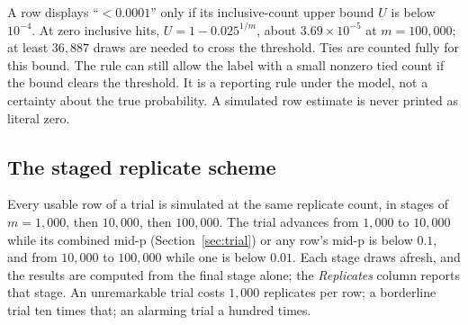 \documentclass[11pt,a4paper]{article}
\begin{document}
A row displays ``$<0.0001$'' only if its inclusive-count upper bound $U$ is below $10^{-4}$. At zero inclusive hits, $U=1-0.025^{1/m}$, about $3.69\times10^{-5}$ at $m=100{,}000$; at least $36{,}887$ draws are needed to cross the threshold. Ties are counted fully for this bound. The rule can still allow the label with a small nonzero tied count if the bound clears the threshold. It is a reporting rule under the model, not a certainty about the true probability. A simulated row estimate is never printed as literal zero.

\subsection{The staged replicate scheme}
\label{sec:staging}

Every usable row of a trial is simulated at the same replicate count, in stages of $m = 1{,}000$, then $10{,}000$, then $100{,}000$. The trial advances from $1{,}000$ to $10{,}000$ while its combined mid-p (Section~\ref{sec:trial}) or any row's mid-p is below $0.1$, and from $10{,}000$ to $100{,}000$ while one is below $0.01$. Each stage draws afresh, and the results are computed from the final stage alone; the \emph{Replicates} column reports that stage. An unremarkable trial costs $1{,}000$ replicates per row; a borderline trial ten times that; an alarming trial a hundred times.
\end{document}
